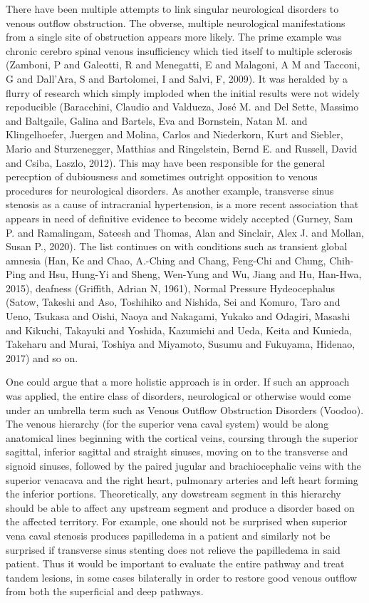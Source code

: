 \documentclass{article}
\begin{document}
There have been multiple attempts to link singular neurological disorders to venous outflow obstruction.
The obverse, multiple neurological manifestations from a single site of obstruction appears more likely.
The prime example was chronic cerebro spinal venous insufficiency which tied itself to multiple sclerosis (Zamboni, P and Galeotti, R and Menegatti, E and Malagoni, A M and Tacconi, G and Dall’Ara, S and Bartolomei, I and Salvi, F, 2009).
It was heralded by a flurry of research which simply imploded when the initial results were not widely repoducible (Baracchini, Claudio and Valdueza, José M. and Del Sette, Massimo and Baltgaile, Galina and Bartels, Eva and Bornstein, Natan M. and Klingelhoefer, Juergen and Molina, Carlos and Niederkorn, Kurt and Siebler, Mario and Sturzenegger, Matthias and Ringelstein, Bernd E. and Russell, David and Csiba, Laszlo, 2012).
This may have been responsible for the general perecption of dubiousness and sometimes outright opposition to venous procedures for neurological disorders.
As another example, transverse sinus stenosis as a cause of intracranial hypertension, is a more recent association that appears in need of definitive evidence to become widely accepted (Gurney, Sam P. and Ramalingam, Sateesh and Thomas, Alan and Sinclair, Alex J. and Mollan, Susan P., 2020).
The list continues on with conditions such as transient global amnesia (Han, Ke and Chao, A.-Ching and Chang, Feng-Chi and Chung, Chih-Ping and Hsu, Hung-Yi and Sheng, Wen-Yung and Wu, Jiang and Hu, Han-Hwa, 2015), deafness (Griffith, Adrian N, 1961), Normal Pressure Hydeocephalus (Satow, Takeshi and Aso, Toshihiko and Nishida, Sei and Komuro, Taro and Ueno, Tsukasa and Oishi, Naoya and Nakagami, Yukako and Odagiri, Masashi and Kikuchi, Takayuki and Yoshida, Kazumichi and Ueda, Keita and Kunieda, Takeharu and Murai, Toshiya and Miyamoto, Susumu and Fukuyama, Hidenao, 2017) and so on.

One could argue that a more holistic approach is in order.
If such an approach was applied, the entire class of disorders, neurological or otherwise would come under an umbrella term such as Venous Outflow Obstruction Disorders (Voodoo).
The venous hierarchy (for the superior vena caval system) would be along anatomical lines beginning with the cortical veins, coursing through the superior sagittal, inferior sagittal and straight sinuses, moving on to the transverse and signoid sinuses, followed by the paired jugular and brachiocephalic veins with the superior venacava and the right heart, pulmonary arteries and left heart forming the inferior portions.
Theoretically, any dowstream segment in this hierarchy should be able to affect any upstream segment and produce a disorder based on the affected territory.
For example, one should not be surprised when superior vena caval stenosis produces papilledema in a patient and similarly not be surprised if transverse sinus stenting does not relieve the papilledema in said patient.
Thus it would be important to evaluate the entire pathway and treat tandem lesions, in some cases bilaterally in order to restore good venous outflow from both the superficial and deep pathways.
\end{document}

